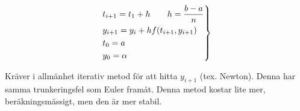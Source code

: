 \begin{equation*}
  \begin{gathered}
    \begin{rcases*}
      t_{i+1} = t_1+h\qquad h=\dfrac{b-a}{n}\\
      y_{i+1}=y_i+hf(t_{i+1}, y_{i+1})\\
      t_0=a\\
      y_0=\alpha
    \end{rcases*}
  \end{gathered}
\end{equation*}
\par\bigskip
\noindent Kräver i allmänhet iterativ metod för att hitta $y_{i+1}$ (tex. Newton). Denna har samma trunkeringsfel som Euler framåt. Denna metod kostar lite mer, beräkningsmässigt, men den är mer stabil.
\par\bigskip
